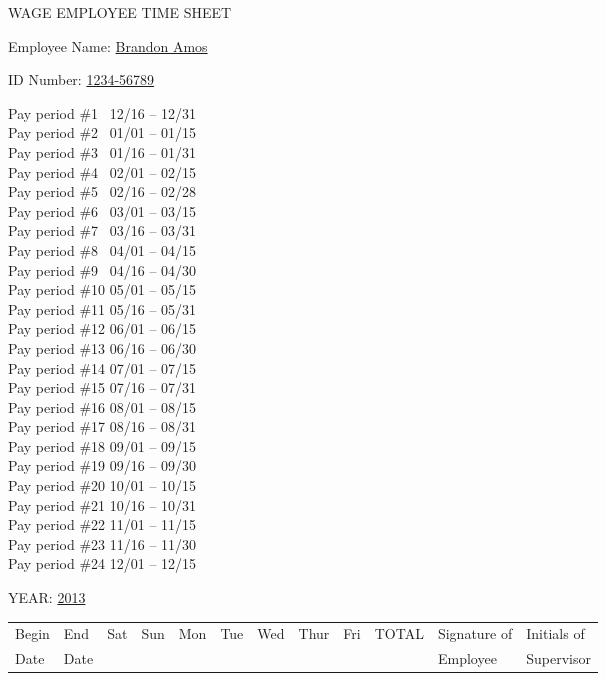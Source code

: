 \documentclass[letterpaper,12pt]{article}
\begin{document}
\begin{center}
WAGE EMPLOYEE TIME SHEET
\end{center}

\hspace{0.5in}Employee Name: \underline{Brandon Amos \hspace{2.5in}}

\vspace{10px}
\hspace{0.5in}ID Number: \hspace{0.25in}
    \underline{1234-56789 \hspace{2.8in}}

\newcommand{\payperiod}[3]{Pay period \##1 \hspace{0.2in} #2 ~ #3\\}
\begin{centering}
\begin{multicols}{2} \noindent
    \payperiod{1~}{12/16 -- 12/31}{\Square}
    \payperiod{2~}{01/01 -- 01/15}{\Square}
    \payperiod{3~}{01/16 -- 01/31}{\Square}
    \payperiod{4~}{02/01 -- 02/15}{\XBox}
    \payperiod{5~}{02/16 -- 02/28}{\Square}
    \payperiod{6~}{03/01 -- 03/15}{\Square}
    \payperiod{7~}{03/16 -- 03/31}{\Square}
    \payperiod{8~}{04/01 -- 04/15}{\Square}
    \payperiod{9~}{04/16 -- 04/30}{\Square}
    \payperiod{10}{05/01 -- 05/15}{\Square}
    \payperiod{11}{05/16 -- 05/31}{\Square}
    \payperiod{12}{06/01 -- 06/15}{\Square}
    \vfill \columnbreak \noindent
    \payperiod{13}{06/16 -- 06/30}{\Square}
    \payperiod{14}{07/01 -- 07/15}{\Square}
    \payperiod{15}{07/16 -- 07/31}{\Square}
    \payperiod{16}{08/01 -- 08/15}{\Square}
    \payperiod{17}{08/16 -- 08/31}{\Square}
    \payperiod{18}{09/01 -- 09/15}{\Square}
    \payperiod{19}{09/16 -- 09/30}{\Square}
    \payperiod{20}{10/01 -- 10/15}{\Square}
    \payperiod{21}{10/16 -- 10/31}{\Square}
    \payperiod{22}{11/01 -- 11/15}{\Square}
    \payperiod{23}{11/16 -- 11/30}{\Square}
    \payperiod{24}{12/01 -- 12/15}{\Square}
\end{multicols}
\end{centering}

YEAR: \underline{2013}

\begin{table}[h]
\center
\begin{tabular}{*{9}{|C}|D|E|E|} \hline
    Begin & End & Sat & Sun & Mon & Tue & Wed & Thur & Fri & TOTAL &
        Signature of & Initials of \\
    Date & Date &&&&&&&&& Employee & Supervisor \\ \hline
     
\end{tabular}
\end{table}
\end{document}
